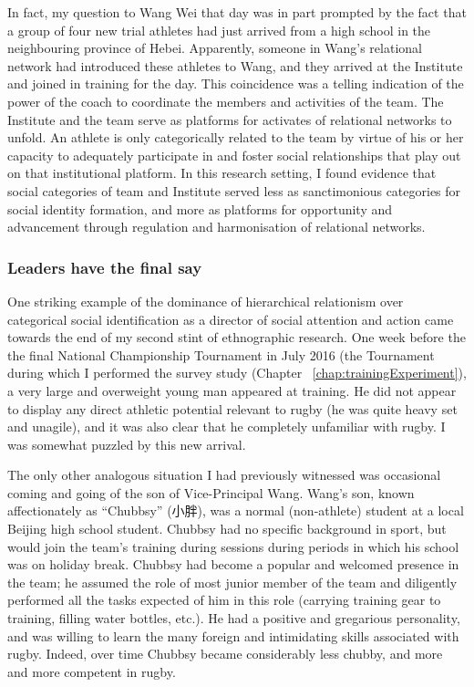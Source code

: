 \begin{CJK}{UTF8}{gbsn}
In fact, my question to Wang Wei that day was in part prompted by the fact that a group of four new trial athletes had just arrived from a high school in the neighbouring province of Hebei.  Apparently, someone in Wang's relational network had introduced these athletes to Wang, and they arrived at the Institute and joined in training for the day.  This coincidence was a telling indication of the power of the coach to coordinate the members and activities of the team.  The Institute and the team serve as platforms for activates of relational networks to unfold.  An athlete is only categorically related to the team by virtue of his or her capacity to adequately participate in and foster social relationships that play out on that institutional platform.  In this research setting, I found evidence that social categories of team and Institute served less as sanctimonious categories for social identity formation, and more as platforms for opportunity and advancement through regulation and harmonisation of relational networks.

\subsubsection{Leaders have the final say}
One striking example of the dominance of hierarchical relationism over categorical social identification as a director of social attention and action came towards the end of my second stint of ethnographic research. One week before the the final National Championship Tournament in July 2016 (the Tournament during which I performed the survey study (Chapter ~\ref{chap:trainingExperiment}), a very large and overweight young man appeared at training.  He did not appear to display any direct athletic potential relevant to rugby (he was quite heavy set and unagile), and it was also clear that he completely unfamiliar with rugby.  I was somewhat puzzled by this new arrival.

The only other analogous situation I had previously witnessed was occasional coming and going of the son of Vice-Principal Wang. Wang's son, known affectionately as ``Chubbsy'' (小胖), was a normal (non-athlete) student at a local Beijing high school student.  Chubbsy had no specific background in sport, but would join the team's training during sessions during periods in which his school was on holiday break.  Chubbsy had become a popular and welcomed presence in the team; he assumed the role of most junior member of the team and diligently performed all the tasks expected of him in this role (carrying training gear to training, filling water bottles, etc.). He had a positive and gregarious personality, and was willing to learn the many foreign and intimidating skills associated with rugby.
Indeed, over time Chubbsy became considerably less chubby, and more and more competent in rugby.


\end{CJK}
